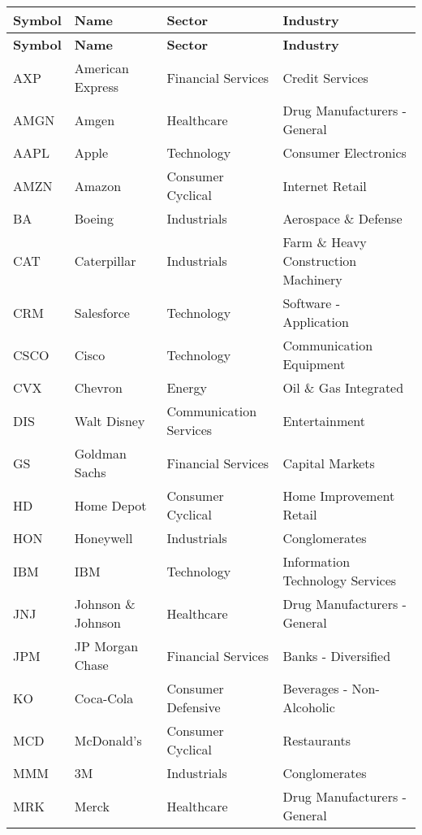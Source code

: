 \begin{longtable}{|p{2cm}|p{3cm}|p{4cm}|p{4cm}|}
\hline
\textbf{Symbol} & \textbf{Name} & \textbf{Sector} & \textbf{Industry} \\
\endfirsthead

\hline
\textbf{Symbol} & \textbf{Name} & \textbf{Sector} & \textbf{Industry} \\
\endhead

\endfoot

\hline
AXP & American Express & Financial Services & Credit Services \\ \hline
AMGN & Amgen & Healthcare & Drug Manufacturers - General \\ \hline
AAPL & Apple & Technology & Consumer Electronics \\ \hline
AMZN & Amazon & Consumer Cyclical & Internet Retail \\ \hline
BA & Boeing & Industrials & Aerospace \& Defense \\ \hline
CAT & Caterpillar & Industrials & Farm \& Heavy Construction Machinery \\ \hline
CRM & Salesforce & Technology & Software - Application \\ \hline
CSCO & Cisco & Technology & Communication Equipment \\ \hline
CVX & Chevron & Energy & Oil \& Gas Integrated \\ \hline
DIS & Walt Disney & Communication Services & Entertainment \\ \hline
GS & Goldman Sachs & Financial Services & Capital Markets \\ \hline
HD & Home Depot & Consumer Cyclical & Home Improvement Retail \\ \hline
HON & Honeywell & Industrials & Conglomerates \\ \hline
IBM & IBM & Technology & Information Technology Services \\ \hline
JNJ & Johnson \& Johnson & Healthcare & Drug Manufacturers - General \\ \hline
JPM & JP Morgan Chase & Financial Services & Banks - Diversified \\ \hline
KO & Coca-Cola & Consumer Defensive & Beverages - Non-Alcoholic \\ \hline
MCD & McDonald's & Consumer Cyclical & Restaurants \\ \hline
MMM & 3M & Industrials & Conglomerates \\ \hline
MRK & Merck & Healthcare & Drug Manufacturers - General \\ \hline

\end{longtable}

